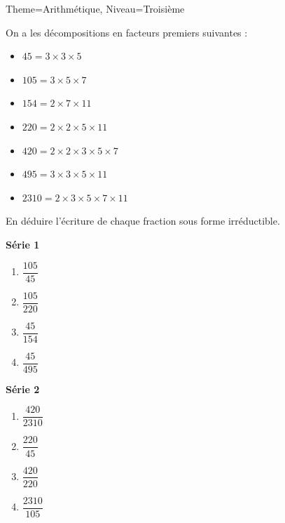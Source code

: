\documentclass[11pt]{article}
\begin{document}
\begin{multicols}{2}
\begin{Maquette}[Fiche]{Theme=Arithmétique, Niveau=Troisième}
        \begin{exercice}
            On a les décompositions en facteurs premiers suivantes :
            \begin{itemize}
                \item $45 = 3 \times 3 \times 5$
                \item $105 = 3 \times 5 \times 7$
                \item $154 = 2 \times 7 \times 11$
                \item $220 = 2 \times 2 \times 5 \times 11$
                \item $420 = 2 \times 2 \times 3 \times 5 \times 7$
                \item $495 = 3 \times 3 \times 5 \times 11$
                \item $2310 = 2 \times 3 \times 5 \times 7 \times 11$
            \end{itemize}
            En déduire l’écriture de chaque fraction sous forme irréductible.
            \begin{multicols}{2}
                \textbf{Série 1}                
                \begin{enumerate}[label=\textbf{\alph*.}]
                    \item $\dfrac{105}{45}$
                    \item $\dfrac{105}{220}$
                    \item $\dfrac{45}{154}$
                    \item $\dfrac{45}{495}$
                \end{enumerate}
                \textbf{Série 2}
                \begin{enumerate}[label=\textbf{\alph*.}]
                    \item $\dfrac{420}{2310}$
                    \item $\dfrac{220}{45}$
                    \item $\dfrac{420}{220}$
                    \item $\dfrac{2310}{105}$
                \end{enumerate}
            \end{multicols}
        \end{exercice}

    \end{Maquette}

\end{multicols}
\end{document}
